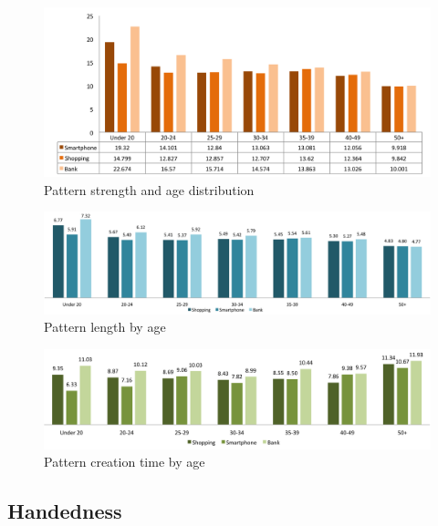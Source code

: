 		\begin{figure}[H]
	    \centering
	    \includegraphics[width=\textwidth]{pics/analysis/strengthagedist.png}
	    \caption{Pattern strength and age distribution}
	    \label{fig:strengthagedist}
  	\end{figure}

  	\begin{figure}[H]
	    \centering
	    \includegraphics[width=\textwidth]{pics/analysis/avgpatternlength-age.png}
	    \caption{Pattern length by age}
	    \label{fig:patternlengthage}
  	\end{figure}

  	\begin{figure}[H]
	    \centering
	    \includegraphics[width=\textwidth]{pics/analysis/creationtime-age.png}
	    \caption{Pattern creation time by age}
	    \label{fig:patterncreationtimeage}
  	\end{figure}

	\subsection{Handedness}

